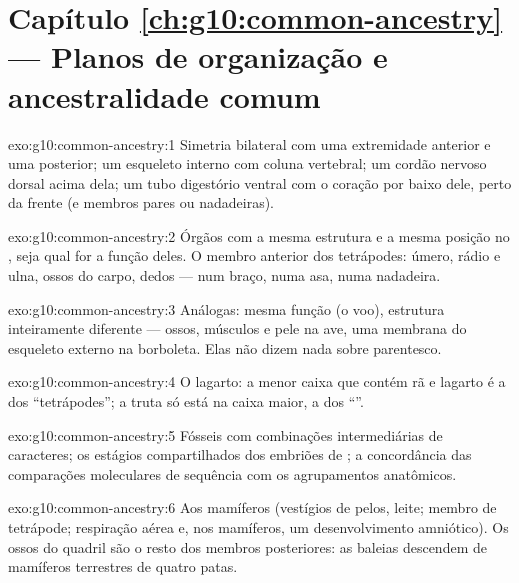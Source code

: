 \section*{Capítulo \ref{ch:g10:common-ancestry} --- Planos de organização e ancestralidade comum}

\begin{solution}{exo:g10:common-ancestry:1}
Simetria bilateral com uma extremidade anterior e uma posterior; um
esqueleto interno com coluna vertebral; um cordão nervoso dorsal acima
dela; um tubo digestório ventral com o coração por baixo dele, perto da
frente (e membros pares ou nadadeiras).
\end{solution}

\begin{solution}{exo:g10:common-ancestry:2}
Órgãos com a mesma estrutura e a mesma posição no ,
seja qual for a função deles. O membro anterior dos tetrápodes: úmero,
rádio e ulna, ossos do carpo, dedos --- num braço, numa asa, numa
nadadeira.
\end{solution}

\begin{solution}{exo:g10:common-ancestry:3}
Análogas: mesma função (o voo), estrutura inteiramente diferente ---
ossos, músculos e pele na ave, uma membrana do esqueleto externo na
borboleta. Elas não dizem nada sobre parentesco.
\end{solution}

\begin{solution}{exo:g10:common-ancestry:4}
O lagarto: a menor caixa que contém rã e lagarto é a dos
``tetrápodes''; a truta só está na caixa maior, a dos ``''.
\end{solution}

\begin{solution}{exo:g10:common-ancestry:5}
Fósseis com combinações intermediárias de caracteres; os estágios
compartilhados dos embriões de ; a concordância das
comparações moleculares de sequência com os agrupamentos anatômicos.
\end{solution}

\begin{solution}{exo:g10:common-ancestry:6}
Aos mamíferos (vestígios de pelos, leite; membro de tetrápode;
respiração aérea e, nos mamíferos, um desenvolvimento amniótico). Os
ossos do quadril são o resto dos membros posteriores: as baleias
descendem de mamíferos terrestres de quatro patas.
\end{solution}

